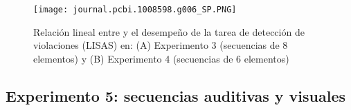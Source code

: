 \begin{figure}[t!]
   \texttt{[image: journal.pcbi.1008598.g006\_SP.PNG]}
   \centering
   \caption{Relación lineal entre \mdlbin y el desempeño de la tarea de detección de violaciones (LISAS) en: (A) Experimento 3 (secuencias de 8 elementos) y (B) Experimento 4 (secuencias de 6 elementos)}
   \label{PlosBIO-F6}
\end{figure}

\subsection{Experimento 5: secuencias auditivas y visuales}


